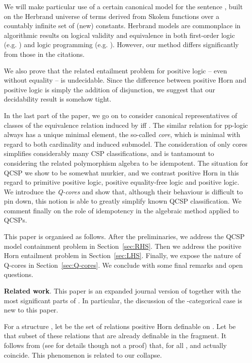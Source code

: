 \documentclass{LMCS}
\begin{document}
We will make particular use of a certain canonical model for the sentence , built on the Herbrand universe of terms derived from Skolem functions over a countably infinite set of (new) constants. Herbrand models are commonplace in algorithmic results on logical validity and equivalence in both first-order logic (e.g. \cite{Kozen81}) and logic programming (e.g. \cite{lifschitz01strongly,EiterFTW07,EiterFW07}). However, our method differs significantly from those in the citations.

We also prove that the related entailment problem for positive logic -- even without equality -- is undecidable. Since the difference between positive Horn and positive logic is simply the addition of disjunction, we suggest that our decidability result is somehow tight.

In the last part of the paper, we go on to consider canonical representatives of classes of the equivalence relation  induced by  iff  . The similar relation for pp-logic always has a unique minimal element, the so-called \emph{core}, which is minimal with regard to both cardinality and induced submodel. The consideration of only cores simplifies considerably many CSP classifications, and is tantamount to considering the related polymorphism algebra to be idempotent. The situation for QCSP we show to be somewhat murkier, and we contrast positive Horn in this regard to primitive positive logic, positive equality-free logic and positive logic. We introduce the \emph{Q-cores} and show that, although their behaviour is difficult to pin down, this notion is able to greatly simplify known QCSP classification. We comment finally on the role of idempotency in the algebraic method applied to QCSPs.

This paper is organised as follows. After the preliminaries, we address the QCSP model containment problem in Section~\ref{sec:RHS}. Then we address the positive Horn entailment problem in Section~\ref{sec:LHS}. Finally, we expose the nature of Q-cores in Section~\ref{sec:Q-cores}. We conclude with some final remarks and open questions.

\textbf{Related work}. This paper is an expanded journal version of \cite{LICS2008} together with the most significant parts of \cite{QCores}. In particular, the discussion of the -categorical case is new to this paper.

For a structure , let  be the set of relations positive Horn definable on . Let  be that subset of these relations that are already definable in the  fragment. It follows from \cite{OxfordAndHubie} (see \cite{HubieSIGACT} for details though not a proof) that, for all ,   and   actually coincide. This phenomenon is related to our  collapse.
\end{document}
